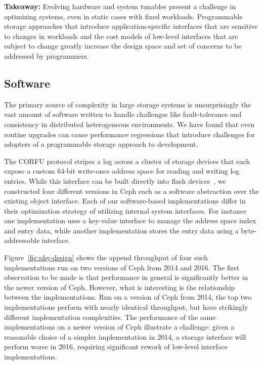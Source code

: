 \textbf{Takeaway:} Evolving hardware and system tunables present a challenge
in optimizing systems, even in static cases with fixed workloads. Programmable
storage approaches that introduce application-specific interfaces that are
sensitive to changes in workloads and the cost models of low-level interfaces
that are subject to change  greatly increase the design space and set of
concerns to be addressed by programmers.

\subsection{Software}

The primary source of complexity in large storage systems is unsurprisingly
the vast amount of software written to handle challenges like fault-tolerance
and consistency in distributed heterogeneous environments. We have found that
even routine upgrades can cause performance regressions that introduce
challenges for adopters of a programmable storage approach to development.

The CORFU protocol stripes a log across a cluster of storage
devices that each expose a custom 64-bit write-once address space for reading
and writing log entries. While this interface can be built directly into flash
devices~\cite{wei:systor13}, we constructed four different versions in Ceph
each as a software abstraction over the existing object interface.
Each of our software-based implementations differ in their optimization
strategy of utilizing internal system interfaces. For instance one
implementation uses a key-value interface to manage the address space index
and entry data, while another implementation stores the entry data using a
byte-addressable interface. 

Figure~\ref{fig:phy-design} shows the append throughput of four such
implementations run on two versions of Ceph from 2014 and 2016. The first
observation to be made is that performance in general is significantly better
in the newer version of Ceph. However, what is interesting is the relationship
between the implementations. Run on a version of Ceph from 2014, the top two
implementations perform with nearly identical throughput, but have strikingly
different implementation complexities. The performance of the same
implementations on a newer version of Ceph illustrate a challenge: given a
reasonable choice of a simpler implementation in 2014, a storage interface
will perform worse in 2016, requiring significant rework of low-level
interface implementations.

